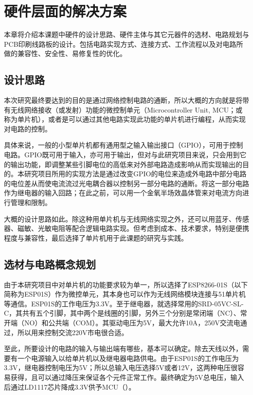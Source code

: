 \setchapterpreamble[u]{\margintoc}
\chapter{硬件层面的解决方案}

\setlength\parindent{2em} 本章将介绍本课题中硬件的设计思路、硬件主体与其它元器件的选材、电路规划与PCB印刷线路板的设计。包括电路实现方式、连接方式、工作流程以及对电路所做的兼容性、安全性、易修复性的优化。

\section{设计思路}

\setlength\parindent{2em} 本次研究最终要达到的目的是通过网络控制电路的通断，所以大概的方向就是将带有无线网络接收（或发射）功能的微控制单元（Microcontroller Unit, MCU；或称为单片机），或者是可以通过其他电路实现此功能的单片机进行编程，从而实现对电路的控制。
\par 具体来说，一般的小型单片机都有通用型之输入输出接口（GPIO），可用于控制电路。GPIO既可用于输入，亦可用于输出，但对与此研究项目来说，只会用到它的输出功能，即调整某些引脚电位的高低来对外部电路造成影响从而实现输出的目的。本研究项目所用的实现方法是通过改变GPIO的电位来造成外电路中部分电路的电位差从而使电流流过光电耦合器以控制另一部分电路的通断。将这一部分电路作为继电器的输入回路；在此之前，可以用一个金氧半场效晶体管来对电流方向进行管理和限制。
\par 大概的设计思路如此。除这种用单片机与无线网络实现之外，还可以用蓝牙、传感器、磁敏、光敏电阻等配合逻辑电路实现。但考虑到成本、技术要求，特别是便携程度与兼容性，最后选择了单片机用于此课题的研究与实践。

\section{选材与电路概念规划}

\setlength\parindent{2em} 由于本研究项目中对单片机的功能要求较为单一，所以选择了ESP8266-01S（以下简称为ESP01S）作为微控单元，其本身也可以作为无线网络模块连接与51单片机等通信。ESP01S的工作电压为3.3V。至于继电器，就选择常用的SRD-05VC-SL-C，其共有五个引脚，其中两个是线圈的引脚，另外三个分别是常闭端（NC）、常开端（NO）和公共端（COM）。其驱动电压为5V，最大允许10A，250V交流电通过，所以用来控制交流220V市电很合适。
\par 至此，所要设计的电路的输入与输出端有哪些，基本可以确定。除去天线以外，需要有一个电源输入以给单片机以及继电器电路供电。由于ESP01S的工作电压为3.3V，继电器控制电压为5V；所以总输入电压选择5V或者12V，这两种电压很容易获得，且可以通过降压来保证各个元件正常工作。最终确定为5V总电压，输入后通过LD1117芯片降成3.3V供予MCU（）。

